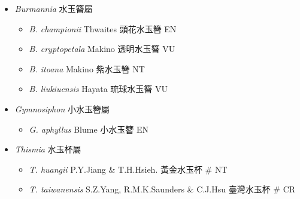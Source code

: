 
  \begin{itemize}
 \item[] \textit{Burmannia} 水玉簪屬
                                
  \begin{itemize}
        \item[] \textit{B. championii} Thwaites  頭花水玉簪   EN
        \item[] \textit{B. cryptopetala} Makino  透明水玉簪   VU
        \item[] \textit{B. itoana} Makino  紫水玉簪   NT
        \item[] \textit{B. liukiuensis} Hayata  琉球水玉簪   VU
  \end{itemize}
 \item[] \textit{Gymnosiphon} 小水玉簪屬
                                
  \begin{itemize}
        \item[] \textit{G. aphyllus} Blume  小水玉簪   EN
  \end{itemize}
 \item[] \textit{Thismia} 水玉杯屬
                                
  \begin{itemize}
        \item[] \textit{T. huangii} P.Y.Jiang \& T.H.Hsieh.  黃金水玉杯  \# NT
        \item[] \textit{T. taiwanensis} S.Z.Yang, R.M.K.Saunders \& C.J.Hsu  臺灣水玉杯  \# CR
  \end{itemize}
  \end{itemize}
